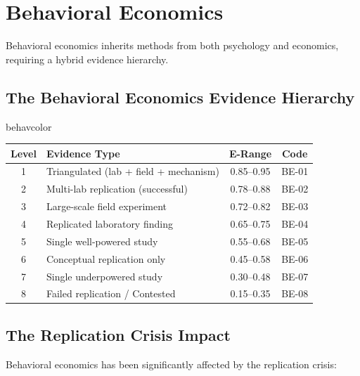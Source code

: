 \documentclass[11pt,a4paper]{article}
\theoremstyle{remark}
\begin{document}

\section{Behavioral Economics}
\label{sec:behavioral}

Behavioral economics inherits methods from both psychology and economics, requiring a hybrid evidence hierarchy.

\subsection{The Behavioral Economics Evidence Hierarchy}

\begin{disciplinebox}{behavcolor}
\begin{center}
\begin{tabular}{clcc}
\toprule
\textbf{Level} & \textbf{Evidence Type} & \textbf{E-Range} & \textbf{Code} \\
\midrule
1 & Triangulated (lab + field + mechanism) & 0.85--0.95 & BE-01 \\
2 & Multi-lab replication (successful) & 0.78--0.88 & BE-02 \\
3 & Large-scale field experiment & 0.72--0.82 & BE-03 \\
4 & Replicated laboratory finding & 0.65--0.75 & BE-04 \\
5 & Single well-powered study & 0.55--0.68 & BE-05 \\
6 & Conceptual replication only & 0.45--0.58 & BE-06 \\
7 & Single underpowered study & 0.30--0.48 & BE-07 \\
8 & Failed replication / Contested & 0.15--0.35 & BE-08 \\
\bottomrule
\end{tabular}
\end{center}
\end{disciplinebox}

\subsection{The Replication Crisis Impact}

Behavioral economics has been significantly affected by the replication crisis:
\end{document}
